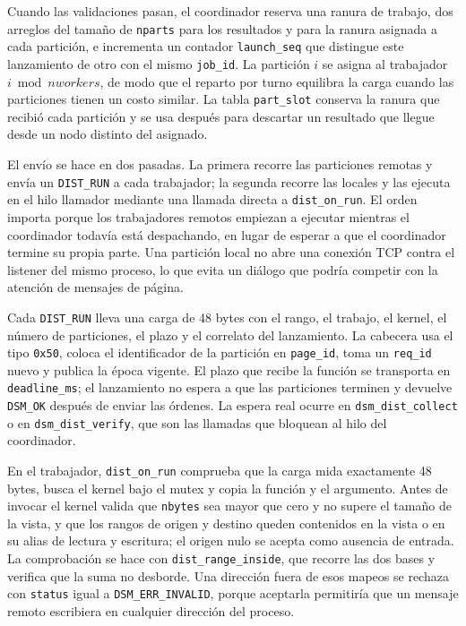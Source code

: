 Cuando las validaciones pasan, el coordinador reserva una ranura de trabajo, dos arreglos del tamaño de \texttt{nparts} para los resultados y para la ranura asignada a cada partición, e incrementa un contador \texttt{launch\_seq} que distingue este lanzamiento de otro con el mismo \texttt{job\_id}. La partición $i$ se asigna al trabajador $i \bmod nworkers$, de modo que el reparto por turno equilibra la carga cuando las particiones tienen un costo similar. La tabla \texttt{part\_slot} conserva la ranura que recibió cada partición y se usa después para descartar un resultado que llegue desde un nodo distinto del asignado.

El envío se hace en dos pasadas. La primera recorre las particiones remotas y envía un \texttt{DIST\_RUN} a cada trabajador; la segunda recorre las locales y las ejecuta en el hilo llamador mediante una llamada directa a \texttt{dist\_on\_run}. El orden importa porque los trabajadores remotos empiezan a ejecutar mientras el coordinador todavía está despachando, en lugar de esperar a que el coordinador termine su propia parte. Una partición local no abre una conexión TCP contra el listener del mismo proceso, lo que evita un diálogo que podría competir con la atención de mensajes de página.

Cada \texttt{DIST\_RUN} lleva una carga de 48 bytes con el rango, el trabajo, el kernel, el número de particiones, el plazo y el correlato del lanzamiento. La cabecera usa el tipo \texttt{0x50}, coloca el identificador de la partición en \texttt{page\_id}, toma un \texttt{req\_id} nuevo y publica la época vigente. El plazo que recibe la función se transporta en \texttt{deadline\_ms}; el lanzamiento no espera a que las particiones terminen y devuelve \texttt{DSM\_OK} después de enviar las órdenes. La espera real ocurre en \texttt{dsm\_dist\_collect} o en \texttt{dsm\_dist\_verify}, que son las llamadas que bloquean al hilo del coordinador.

En el trabajador, \texttt{dist\_on\_run} comprueba que la carga mida exactamente 48 bytes, busca el kernel bajo el mutex y copia la función y el argumento. Antes de invocar el kernel valida que \texttt{nbytes} sea mayor que cero y no supere el tamaño de la vista, y que los rangos de origen y destino queden contenidos en la vista o en su alias de lectura y escritura; el origen nulo se acepta como ausencia de entrada. La comprobación se hace con \texttt{dist\_range\_inside}, que recorre las dos bases y verifica que la suma no desborde. Una dirección fuera de esos mapeos se rechaza con \texttt{status} igual a \texttt{DSM\_ERR\_INVALID}, porque aceptarla permitiría que un mensaje remoto escribiera en cualquier dirección del proceso.

